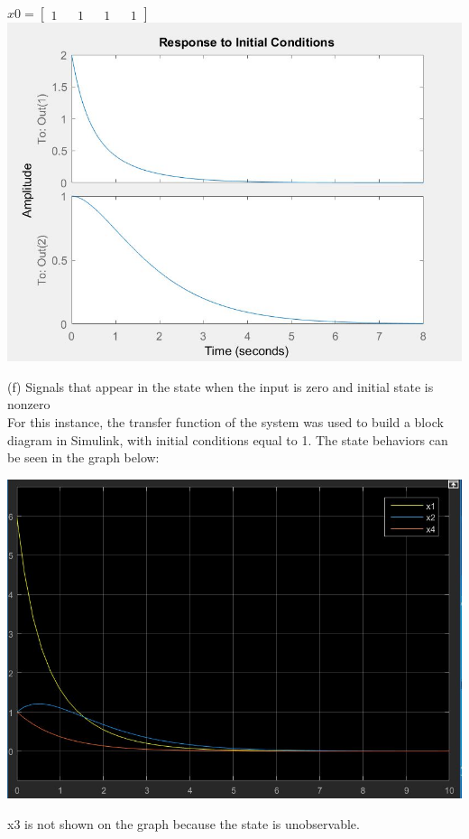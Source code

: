 \documentclass[paper=a4,margin, fontsize=11pt]{scrartcl} %
\numberwithin{equation}{section} %
\numberwithin{figure}{section} %
\numberwithin{table}{section} %
\begin{document}
\begin{center} 
$x0=\begin{bmatrix}1 && 1 && 1 && 1\end{bmatrix}$\\
{\includegraphics{6e}}
\end{center}
(f) Signals that appear in the state when the input is zero and initial state is nonzero\\ 
For this instance, the transfer function of the system was used to build a block diagram in Simulink, with initial conditions equal to 1.  The state behaviors can be seen in the graph below:
\begin{center}
{\includegraphics{6f}}
\end{center}
x3 is not shown on the graph because the state is unobservable.\\
\end{document}
